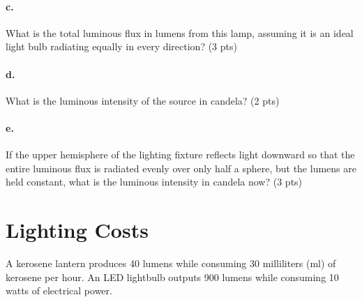 \documentclass{article}
\newif\ifsolution
\newcommand{\solution}[1]
{\ifsolution
\vspace{10pt}
{\color{answer-color} #1}
\else\fi}
\newcommand{\ufrac}[2]{\frac{\textrm{#1}}{\textrm{#2}}}
\begin{document}
\solution{
Both lux and foot-candles are units of luminous flux per unit area, so
we can convert between them with a unit conversion.
$$ 60 lux \cdot \ufrac{1 fc}{10.76 lux} = 5.58 fc$$
}

\paragraph{c.} What is the total luminous flux in lumens from this lamp, assuming it
is an ideal light bulb radiating equally in every direction? (3 pts)

\solution{
Based on the assumption of uniform illumination at all angles, we
estimate that the total luminous flux is equal to the illuminance
multiplied by the area of the sphere with a radius of 2 meters.
$$ 60 lux \cdot 4 \pi r^2 $$
$$ 60 lux \cdot 4 \cdot 3.14 \cdot 4m^2 = 3014 lumens $$
This is equivalent to two 100 watt incandescent lightbulbs.
}

\paragraph{d.} What is the luminous intensity of the source in candela? (2 pts)

\solution{
Recall that luminous intensity is the lumens per solid angle and that
there are 4$\pi$ or about 12 steradians in sphere.  To get the luminous
intensity we divide the lumens by the solid angle.
$$ 3014 / (4 * 3.14) = 240 candela$$
}

\paragraph{e.} If the upper hemisphere of the lighting fixture reflects light
downward so that the entire luminous flux is radiated evenly over only half a
sphere, but the lumens are held constant, what is the luminous intensity
in candela now? (3 pts)

\solution{
Our fixture reduces the solid angle in which light radiates from the
entire sphere to half a sphere.  This means that the solid angle reduces
from 4$\pi$ to 2$\pi$ steradians or from about 12 to about 6 steradians.
The luminous intensity increases by a factor of 2 to 480 candelas.
}


\section{Lighting Costs}

A kerosene lantern produces 40 lumens while consuming 30 milliliters
(ml) of kerosene
per hour.  An LED lightbulb outputs 900 lumens while consuming 10 watts
of electrical power.
\end{document}
